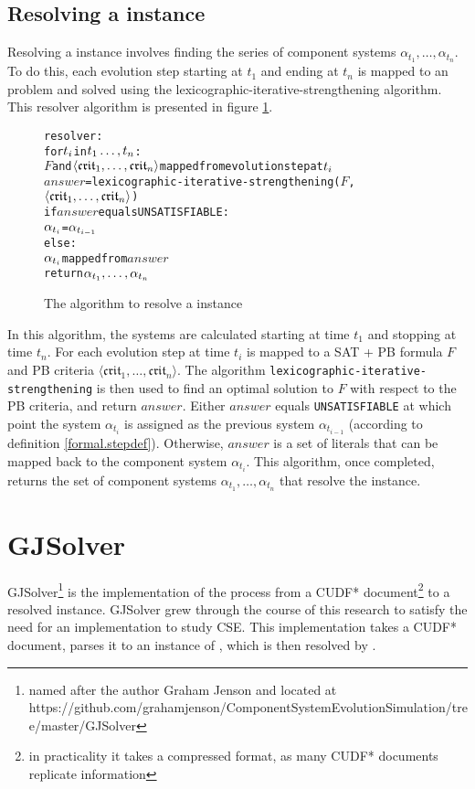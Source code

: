 \subsection{Resolving a \modelname instance}
Resolving a \modelname instance involves finding the series of component systems $\alpha_{t_1},\ldots,\alpha_{t_n}$.
To do this, each evolution step starting at $t_1$ and ending at $t_n$ is mapped to an \modelimpl problem and solved using the lexicographic-iterative-strengthening algorithm.
This resolver algorithm is presented in figure \ref{impl.resolver}.
\begin{figure}[h!t!]
\begin{center}
\begin{alltt}
resolver:  
    for \(t\sb{i}\) in \(t\sb{1}\ldots,t\sb{n}\):
        \(F\) and \(\langle{}\mathfrak{crit}\sb{1}, \ldots ,\mathfrak{crit}\sb{n}\rangle\) mapped from evolution step at \(t\sb{i}\)
        \(answer\) = lexicographic-iterative-strengthening(\(F\),\(\langle{}\mathfrak{crit}\sb{1}, \ldots ,\mathfrak{crit}\sb{n}\rangle\))
        if \(answer\) equals UNSATISFIABLE:
            \(\alpha\sb{t\sb{i}}\) = \(\alpha\sb{t\sb{i-1}}\)
        else:
            \(\alpha\sb{t\sb{i}}\) mapped from \(answer\)
    return \(\alpha\sb{t\sb{1}},\ldots,\alpha\sb{t\sb{n}}\) 
\end{alltt}
  \caption{The algorithm to resolve a \modelname instance}
  \label{impl.resolver}
\end{center}
\end{figure}

In this algorithm, the systems are calculated starting at time $t_1$ and stopping at time $t_n$.
For each evolution step at time $t_i$ is mapped to a SAT + PB formula $F$ and PB criteria $\langle \mathfrak{crit}_{1}, \ldots ,\mathfrak{crit}_{n} \rangle$.
The algorithm \texttt{lexicographic-iterative-strengthening} is then used to find an optimal solution to $F$ with respect to the PB criteria, and return $answer$.
Either $answer$ equals \texttt{UNSATISFIABLE} at which point the system $\alpha_{t_i}$ is assigned as the previous system $\alpha_{t_{i-1}}$ (according to definition \ref{formal.stepdef}).
Otherwise, $answer$ is a set of literals that can be mapped back to the component system $\alpha_{t_i}$.
This algorithm, once completed, returns the set of component systems $\alpha_{t_1},\ldots,\alpha_{t_n}$ that resolve the \modelname instance.

\section{GJSolver}
\label{impl.gjsolver}
GJSolver\footnote{named after the author Graham Jenson and located at https://github.com/grahamjenson/ComponentSystemEvolutionSimulation/tree/master/GJSolver} 
is the implementation of the process from a CUDF* document\footnote{in practicality it takes a compressed format, as many CUDF* documents replicate information} to a resolved \modelname instance.
GJSolver grew through the course of this research to satisfy the need for an implementation to study CSE.
This implementation takes a CUDF* document, parses it to an instance of \modelname, which is then resolved by \modelimpl.

